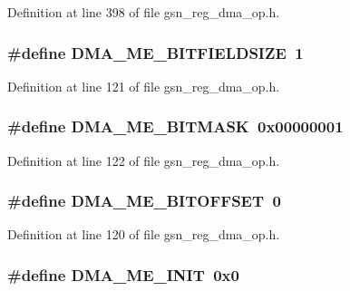 Definition at line 398 of file gsn\_\-reg\_\-dma\_\-op.h.

\hypertarget{a00547_aff6beddf89e8b7af7377279431360c01}{
\subsubsection[{DMA\_\-ME\_\-BITFIELDSIZE}]{\setlength{\rightskip}{0pt plus 5cm}\#define DMA\_\-ME\_\-BITFIELDSIZE~1}}
\label{a00547_aff6beddf89e8b7af7377279431360c01}


Definition at line 121 of file gsn\_\-reg\_\-dma\_\-op.h.

\hypertarget{a00547_aafb9aa03d070970b79fd94037619f61a}{
\subsubsection[{DMA\_\-ME\_\-BITMASK}]{\setlength{\rightskip}{0pt plus 5cm}\#define DMA\_\-ME\_\-BITMASK~0x00000001}}
\label{a00547_aafb9aa03d070970b79fd94037619f61a}


Definition at line 122 of file gsn\_\-reg\_\-dma\_\-op.h.

\hypertarget{a00547_af26e520e052c29bec34ee52bab49bb9b}{
\subsubsection[{DMA\_\-ME\_\-BITOFFSET}]{\setlength{\rightskip}{0pt plus 5cm}\#define DMA\_\-ME\_\-BITOFFSET~0}}
\label{a00547_af26e520e052c29bec34ee52bab49bb9b}


Definition at line 120 of file gsn\_\-reg\_\-dma\_\-op.h.

\hypertarget{a00547_aeaa1845f74e1ae1db7a24a7dcd2b7438}{
\subsubsection[{DMA\_\-ME\_\-INIT}]{\setlength{\rightskip}{0pt plus 5cm}\#define DMA\_\-ME\_\-INIT~0x0}}
\label{a00547_aeaa1845f74e1ae1db7a24a7dcd2b7438}


